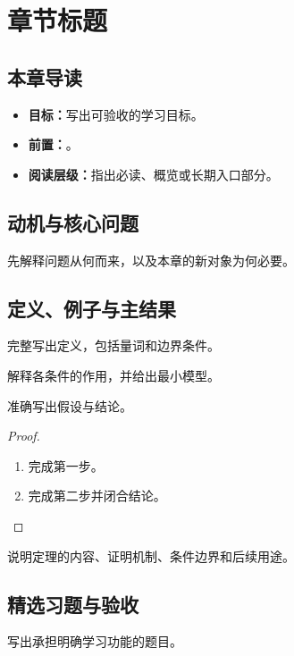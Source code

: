 \chapter{章节标题}
\label{ch:01}

\section*{本章导读}

\begin{itemize}
  \item \textbf{目标：}写出可验收的学习目标。
  \item \textbf{前置：}。
  \item \textbf{阅读层级：}指出必读、概览或长期入口部分。
\end{itemize}

\section{动机与核心问题}
\label{sec:ch01-motivation}

先解释问题从何而来，以及本章的新对象为何必要。

\section{定义、例子与主结果}
\label{sec:ch01-main}

\begin{definition}
完整写出定义，包括量词和边界条件。
\end{definition}

\begin{note}
解释各条件的作用，并给出最小模型。
\end{note}

\begin{theorem}[示例主定理]
\label{thm:ch01-main}
准确写出假设与结论。
\end{theorem}

\begin{proof}
\leavevmode
\begin{enumerate}
  \item 完成第一步。

  \item 完成第二步并闭合结论。
\end{enumerate}
\end{proof}

\begin{note}
说明定理的内容、证明机制、条件边界和后续用途。
\end{note}

\section{精选习题与验收}

\begin{exercise}
\label{ex:ch01-01}
写出承担明确学习功能的题目。

\quad
{}
\end{exercise}


